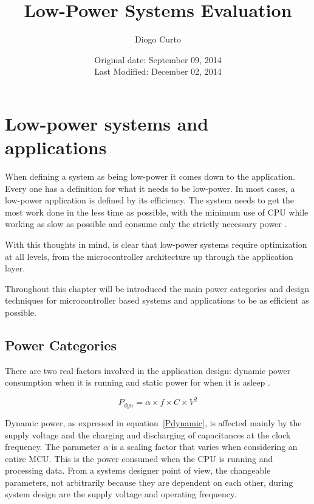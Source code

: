 \documentclass[11pt,a4paper]{report}
\author{Diogo Curto}
\title{Low-Power Systems Evaluation}
\date{Original date: September 09, 2014 \\ Last Modified: December 02, 2014}
\begin{document}
\begin{titlepage}
\hypersetup{pageanchor=false}
\maketitle
\hypersetup{pageanchor=true}
\end{titlepage}

\tableofcontents

\chapter{Low-power systems and applications}

When defining a system as being low-power it comes down to the application. Every one has a definition for what it needs to be low-power. In most cases, a low-power application is defined by its efficiency. 
The system needs to get the most work done in the less time as possible, with the minimum use of CPU while working as slow as possible and consume only the strictly necessary power \cite{Wong2009}.


With this thoughts in mind, is clear that low-power systems require optimization at all levels, from the microcontroller architecture up through the application layer.

Throughout this chapter will be introduced the main power categories and design techniques for microcontroller based systems and applications to be as efficient as possible.

\section{Power Categories}\label{Power_Categories}
There are two real factors involved in the application design: dynamic power consumption when it is running and static power for when it is asleep \cite{SedraSmith}.

\begin{equation} \label{Pdynamic}
P_{dyn} =\alpha \times f \times C \times V^2
\end{equation}

Dynamic power, as expressed in equation~\ref{Pdynamic}, is affected mainly by the supply voltage and the charging and discharging of capacitances at the clock frequency.
The parameter $\alpha $ is a scaling factor that varies when considering an entire MCU. This is the power consumed when the CPU is running and processing data. From a systems designer point of view, the changeable parameters, not arbitrarily because they are dependent on each other, during system design are the supply voltage and operating frequency. 
\end{document}
